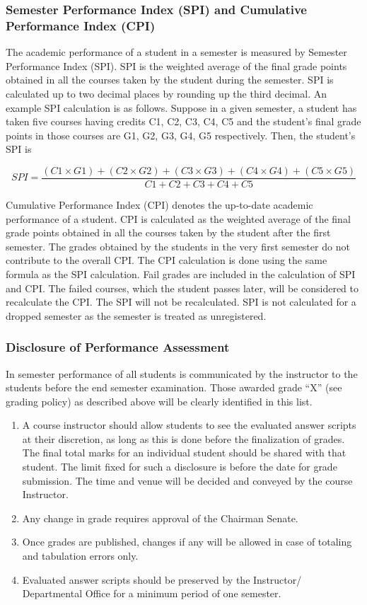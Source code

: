 \subsubsection{Semester Performance Index (SPI) and Cumulative Performance Index (CPI)}

The academic performance of a student in a semester is measured by Semester Performance Index (SPI). SPI is the weighted average of the final grade points obtained in all the courses taken by the student during the semester. SPI is calculated up to two decimal places by rounding up the third decimal. An example SPI calculation is as follows. Suppose in a given semester, a student has taken five courses having credits C1, C2, C3, C4, C5 and the student’s final grade points in those courses are G1, G2, G3, G4, G5 respectively. Then, the student’s SPI is

\[SPI=\frac{(C1×G1)+(C2×G2)+(C3×G3)+(C4×G4)+(C5×G5)}{C1+C2+C3+C4+C5}\]

Cumulative Performance Index (CPI) denotes the up-to-date academic performance of a student. CPI is calculated as the weighted average of the final grade points obtained in all the courses taken by the student after the first semester. The grades obtained by the students in the very first semester do not contribute to the overall CPI. The CPI calculation is done using the same formula as the SPI calculation. Fail grades are included in the calculation of SPI and CPI. The failed courses, which the student passes later, will be considered to recalculate the CPI. The SPI will not be recalculated. SPI is not calculated for a dropped semester as the semester is treated as unregistered. 

\subsubsection{Disclosure of Performance Assessment}

In semester performance of all students is communicated by the instructor to the students before the end semester examination. Those awarded grade “X” (see grading policy) as described above will be clearly identified in this list.

\begin{enumerate}
    \item A course instructor should allow students to see the evaluated answer scripts at their discretion, as long as this is done before the finalization of grades. The final total marks for an individual student should be shared with that student. The limit fixed for such a disclosure is before the date for grade submission. The time and venue will be decided and conveyed by the course Instructor.
    \item Any change in grade requires approval of the Chairman Senate.
    \item Once grades are published, changes if any will be allowed in case of totaling and tabulation errors only. 
    \item Evaluated answer scripts should be preserved by the Instructor/ Departmental Office for a minimum period of one semester. 
\end{enumerate}


